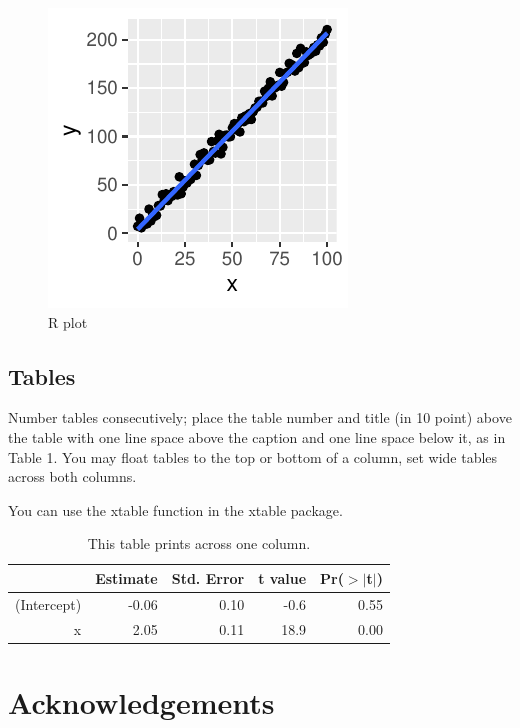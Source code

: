 \documentclass[10pt, letterpaper]{article}
\newenvironment{CodeChunk}{}{}
\begin{document}
\begin{CodeChunk}
\begin{figure}[H]

{\centering \includegraphics{figs/plot-1} 

}

\caption[R plot]{R plot}\label{fig:plot}
\end{figure}
\end{CodeChunk}

\hypertarget{tables}{%
\subsection{Tables}\label{tables}}

Number tables consecutively; place the table number and title (in 10
point) above the table with one line space above the caption and one
line space below it, as in Table 1. You may float tables to the top or
bottom of a column, set wide tables across both columns.

You can use the xtable function in the xtable package.

\begin{table}[H]
\centering
\begin{tabular}{rrrrr}
  \hline
 & Estimate & Std. Error & t value & Pr($>$$|$t$|$) \\ 
  \hline
(Intercept) & -0.06 & 0.10 & -0.6 & 0.55 \\ 
  x & 2.05 & 0.11 & 18.9 & 0.00 \\ 
   \hline
\end{tabular}
\caption{This table prints across one column.} 
\end{table}

\hypertarget{acknowledgements}{%
\section{Acknowledgements}\label{acknowledgements}}
\end{document}
